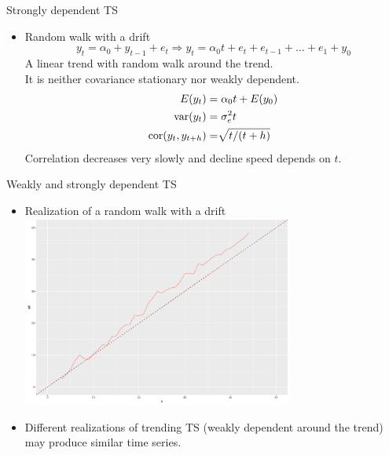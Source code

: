 \documentclass{beamer}
\begin{document}
\begin{frame}{Strongly dependent TS}
\begin{itemize}
\item Random walk with a drift
$$ y_t=\alpha_0+y_{t-1}+e_t \Rightarrow y_t =\alpha_0 t + e_{t} + e_{t-1} +  \dots +e_1 + y_0$$
A linear trend with random walk around the trend. \\ It is neither covariance stationary nor weakly dependent.
\begin{align}\nonumber
E(y_t) & =\alpha_0 t +E(y_0)\\\nonumber
\textnormal{var}(y_t) & =\sigma^2_e t\\\nonumber
\textnormal{cor}(y_t,y_{t+h}) & =\sqrt[]{t/(t+h)}
\end{align} 
Correlation decreases very slowly and decline speed depends on $t$.
\end{itemize}
\end{frame}
\begin{frame}{Weakly and strongly dependent TS}
\begin{itemize}
\item Realization of a random walk with a drift \\ 
\vspace{0.2cm}
\includegraphics[width=0.7\textwidth]{img/random_walk_drift.pdf}
\item Different realizations of trending TS (weakly dependent around the trend) may produce similar time series.
\end{itemize}
\end{frame}
\end{document}
